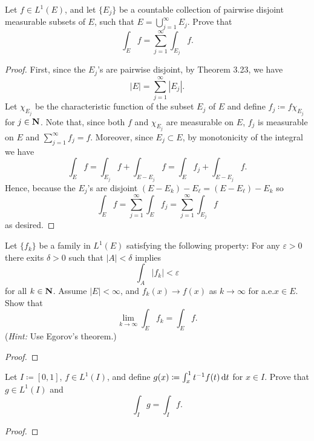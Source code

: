 \begin{problem}
Let $f\in L^1(E)$, and let $\{E_j\}$ be a countable collection of pairwise
disjoint measurable subsets of $E$, such that $E=\bigcup_{j=1}^\infty
E_j$. Prove that
\[
\int_E f=\sum_{j=1}^\infty\int_{E_j}f.
\]
\end{problem}
\begin{proof}
First, since the $E_j$'s are pairwise disjoint, by Theorem 3.23, we have
\begin{equation}
\label{eq:disjoint-measure-2-2}
|E|=\sum_{j=1}^\infty|E_j|.
\end{equation}
Let $\chi_{E_j}$ be the characteristic function of the subset $E_j$ of
$E$ and define $f_j\coloneqq f\chi_{E_j}$ for $j\in\mathbf{N}$. Note that, since
both $f$ and $\chi_{E_j}$ are measurable on $E$, $f_j$ is
measurable on $E$ and $\sum_{j=1}^\infty f_j=f$. Moreover, since
$E_j\subset E$, by monotonicity of the integral we have
\begin{equation}
\label{eq:monotonicity-2-2}
\int_{E} f=
\int_{E_j} f+\int_{E\minus E_j}f=
\int_E f_j+\int_{E\minus E_j}f.
\end{equation}
Hence, because the $E_j$'s are disjoint $(E\minus E_k)\minus
E_\ell=(E\minus E_\ell)\minus E_k$ so
\begin{equation}
\label{eq:desired-sum-2}
\int_E f=\sum_{j=1}^\infty\int_E f_j=\sum_{j=1}^\infty\int_{E_j}f
\end{equation}
as desired.
\end{proof}

\begin{problem}
Let $\{f_k\}$ be a family in $L^1(E)$ satisfying the following property:
For any $\varepsilon>0$ there exits $\delta>0$ such that $|A|<\delta$
implies
\[
\int_A |f_k|<\varepsilon
\]
for all $k\in\mathbf{N}$. Assume $|E|<\infty$, and $f_k(x)\to f(x)$ as
$k\to\infty$ for a.e.\@ $x\in E$. Show that
\[
\lim_{k\to\infty}\int_E f_k=\int_E f.
\]
(\emph{Hint:} Use Egorov's theorem.)
\end{problem}
\begin{proof}

\end{proof}

\begin{problem}
Let $I\coloneqq[0,1]$, $f\in L^1(I)$, and define $g(x)\coloneqq\int_x^1
t^{-1}f(t)\mathop{}\!\mathrm{d} t$ for $x\in I$. Prove that $g\in L^1(I)$ and
\[
\int_I g=\int_I f.
\]
\end{problem}
\begin{proof}
\end{proof}

